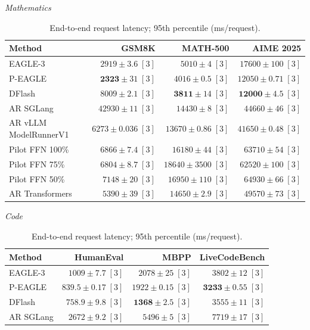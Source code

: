 \begin{table}[!htp]
\centering\small
\setlength{\tabcolsep}{3pt}
\caption{End-to-end request latency; 95th percentile (ms/request).}
\label{tab:appendix-metric-completion-95th-percentile-none}
\textit{Mathematics}\par\smallskip
\begin{tabular}{@{}>{\raggedright\arraybackslash}p{3.7cm}rrr@{}}
\toprule
Method & GSM8K & MATH-500 & AIME 2025 \\
\midrule
EAGLE-3 & \(2919 \pm 3.6\;[3]\) & \(5010 \pm 4\;[3]\) & \(17600 \pm 100\;[3]\) \\
P-EAGLE & \(\mathbf{2323} \pm 31\;[3]\) & \(4016 \pm 0.5\;[3]\) & \(12050 \pm 0.71\;[3]\) \\
DFlash & \(8009 \pm 2.1\;[3]\) & \(\mathbf{3811} \pm 14\;[3]\) & \(\mathbf{12000} \pm 4.5\;[3]\) \\
AR \textperiodcentered{} SGLang & \(42930 \pm 11\;[3]\) & \(14430 \pm 8\;[3]\) & \(44660 \pm 46\;[3]\) \\
AR \textperiodcentered{} vLLM ModelRunnerV1 & \(6273 \pm 0.036\;[3]\) & \(13670 \pm 0.86\;[3]\) & \(41650 \pm 0.48\;[3]\) \\
Pilot FFN 100\% & \(6866 \pm 7.4\;[3]\) & \(16180 \pm 44\;[3]\) & \(63710 \pm 54\;[3]\) \\
Pilot FFN 75\% & \(6804 \pm 8.7\;[3]\) & \(18640 \pm 3500\;[3]\) & \(62520 \pm 100\;[3]\) \\
Pilot FFN 50\% & \(7148 \pm 20\;[3]\) & \(16950 \pm 110\;[3]\) & \(64930 \pm 66\;[3]\) \\
AR \textperiodcentered{} Transformers & \(5390 \pm 39\;[3]\) & \(14650 \pm 2.9\;[3]\) & \(49570 \pm 73\;[3]\) \\
\bottomrule
\end{tabular}\par\medskip
\textit{Code}\par\smallskip
\begin{tabular}{@{}>{\raggedright\arraybackslash}p{3.7cm}rrr@{}}
\toprule
Method & HumanEval & MBPP & LiveCodeBench \\
\midrule
EAGLE-3 & \(1009 \pm 7.7\;[3]\) & \(2078 \pm 25\;[3]\) & \(3802 \pm 12\;[3]\) \\
P-EAGLE & \(839.5 \pm 0.17\;[3]\) & \(1922 \pm 0.15\;[3]\) & \(\mathbf{3233} \pm 0.55\;[3]\) \\
DFlash & \(\mathbf{758.9} \pm 9.8\;[3]\) & \(\mathbf{1368} \pm 2.5\;[3]\) & \(3555 \pm 11\;[3]\) \\
AR \textperiodcentered{} SGLang & \(2672 \pm 9.2\;[3]\) & \(5496 \pm 5\;[3]\) & \(7719 \pm 17\;[3]\) \\

\end{tabular}
\end{table}
